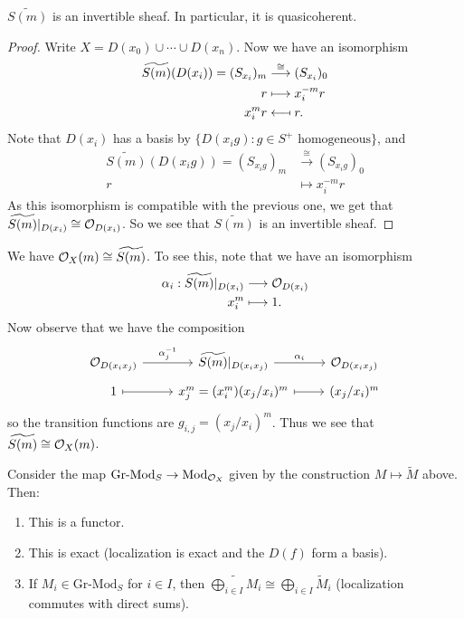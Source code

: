 \begin{prop}
  $\widetilde{S(m)}$ is an invertible
  sheaf. In particular, it is quasicoherent.
\end{prop}

\begin{proof}
  Write $X = D(x_0) \cup \cdots \cup D(x_n)$.
  Now we have an isomorphism
  \begin{align*}
    \widetilde{S(m)}(D(x_i))
    = (S_{x_i})_m
    &\overset{\cong}{\longrightarrow}
    (S_{x_i})_0 \\
    r &\longmapsto x_i^{-m} r \\
    x_i^m r &\mathrel{\reflectbox{\ensuremath{\longmapsto}}} r.
  \end{align*}
  Note that $D(x_i)$ has a basis by
  $\{D(x_i g) : g \in S^+ \text{ homogeneous}\}$,
  and
  \begin{align*}
    \widetilde{S(m)}(D(x_i g))
    = (S_{x_i g})_m
    &\overset{\cong}{\longrightarrow}
    (S_{x_i g})_0 \\
    r &\longmapsto x_i^{-m} r
  \end{align*}
  As this isomorphism is compatible
  with the previous one, we get that
  $\widetilde{S(m)}|_{D(x_i)} \cong \mathcal{O}_{D(x_i)}$.
  So we see that
  $\widetilde{S(m)}$ is an invertible sheaf.
\end{proof}

\begin{remark}
  We have $\mathcal{O}_X(m) \cong \widetilde{S(m)}$.
  To see this, note that we have an
  isomorphism
  \begin{align*}
    \alpha_i : \widetilde{S(m)}|_{D(x_i)}
    &\longrightarrow
    \mathcal{O}_{D(x_i)} \\
    x_i^m  &\longmapsto 1.
  \end{align*}
  Now observe that we have the composition
  \[
    \begin{tikzcd}[row sep=tiny]
      \OO_{D(x_i x_j)} \ar[r, "\alpha_j^{-1}"]
      & \widetilde{S(m)}|_{D(x_i x_j)} \ar[r, "\alpha_i"]
      & \OO_{D(x_i x_j)} \\
      1 \ar[r, mapsto] & x_j^m = (x_i^m)(x_j / x_i)^m
      \ar[r, mapsto] & (x_j / x_i)^m
    \end{tikzcd}
  \]
  so the transition functions are
  $g_{i, j} = (x_j / x_i)^m$. Thus
  we see that $\widetilde{S(m)} \cong \mathcal{O}_X(m)$.
\end{remark}

\begin{remark}
  Consider the map
  $\mathrm{Gr}\text{-}\mathrm{Mod}_S \to \mathrm{Mod}_{\mathcal{O}_X}$
  given by the construction
  $M \mapsto \widetilde{M}$ above. Then:
  \begin{enumerate}
    \item This is a functor.
    \item This is exact (localization
      is exact and the $D(f)$ form a basis).
    \item If $M_i \in \mathrm{Gr}\text{-}\mathrm{Mod}_S$
      for $i \in I$, then
      $\widetilde{\bigoplus_{i \in I} M_i} \cong \bigoplus_{i \in I} \widetilde{M}_i$
      (localization commutes with
      direct sums).
  \end{enumerate}
\end{remark}

